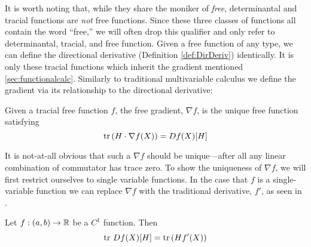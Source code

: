 It is worth noting that, while they share the moniker of \emph{free},
determinantal and tracial functions are \emph{not} free functions.
Since these three classes of functions all contain the word ``free,'' we will
often drop this qualifier and only refer to determinantal, tracial, and free
function.  Given a free function of any type, we can define the directional
derivative (Definition \ref{def:DirDeriv}) identically. It is only these tracial functions which inherit
the gradient mentioned \cref{sec:functionalcalc}.  Similarly to traditional multivariable calculus
we define the gradient via its relationship to the directional derivative:
\begin{definition}%
\label{def:FreeGrad}
  Given a tracial free function \(f\), the free gradient, \(\nabla f\), is the
  unique free function satisfying
  \[
    \operatorname{tr} \left( H \cdot \nabla f(X) \right) = Df(X)[H]
  \]
\end{definition}

It is not-at-all obvious that such a \(\nabla f \) should be unique---after all
any linear combination of commutator has trace zero. To show the uniqueness of
\(\nabla f\), we will first restrict ourselves to single variable functions. In the case that \(f\)
is a single-variable function we can replace \(\nabla f\) with the traditional
derivative, \(f'\), as seen in
\cite[Thm 3.3]{pascoeTrace2020}.
\begin{theorem}
  Let \(f: (a,b)\to \mathbb{R} \) be a \(C^1\) function. Then
  \[
    \operatorname{tr} \, Df(X)[H] = \operatorname{tr} \left( Hf'(X) \right)
  \]
\end{theorem}

